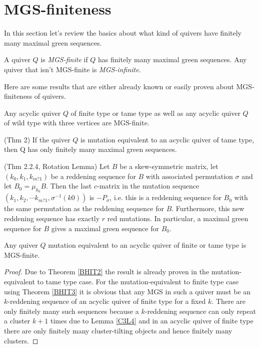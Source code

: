 \section{MGS-finiteness}
\indent In this section let's review the basics about what kind of quivers have finitely many maximal green sequences.
\begin{definition}
A quiver $Q$ is \textit{MGS-finite} if $Q$ has finitely many maximal green sequences. Any quiver that isn't MGS-finite is \textit{MGS-infinite}.
\end{definition}
\indent Here are some results that are either already known or easily proven about MGS-finiteness of quivers.
\begin{theorem}
\cite{BDP13}Any acyclic quiver $Q$ of finite type or tame type as well as any acyclic quiver $Q$ of wild type with three vertices are MGS-finite.
\end{theorem}
\begin{theorem}
\cite{BHIT15} (Thm 2)\label{BHIT2} If the quiver $Q$ is mutation equivalent to an acyclic quiver of tame type, then Q has only finitely many maximal green sequences.
\end{theorem}
\begin{theorem}
\cite{BHIT15} (Thm 2.2.4, Rotation Lemma) \label{BHIT3} Let $B$ be a skew-symmetric matrix, let $(k_0, k_1, k_{m?1})$ be a reddening sequence for $B$ with associated permutation $\sigma$ and let $B_0 = \mu_{k_0}B$. Then the last $c$-matrix in the mutation sequence $(k_1, k_2, \cdots k_{m?1}, \sigma^{-1}(k0))$ is $-P_{\sigma}$, i.e. this is a reddening sequence for $B_0$ with the same permutation as the reddening sequence for $B$. Furthermore, this new reddening sequence has exactly $r$ red mutations. In particular, a maximal green sequence for $B$ gives a maximal green sequence for $B_0$.
\end{theorem}
\begin{theorem}
Any quiver $Q$ mutation equivalent to an acyclic quiver of finite or tame type is MGS-finite.
\end{theorem}
\begin{proof}
Due to Theorem \ref{BHIT2} the result is already proven in the mutation-equivalent to tame type case. For the mutation-equivalent to finite type case using Theorem \ref{BHIT3} it is obvious that any MGS in such a quiver must be an $k$-reddening sequence of an acyclic quiver of finite type for a fixed $k$. There are only finitely many such sequences because a $k$-reddening sequence can only repeat a cluster $k+1$ times due to Lemma \ref{C3L4} and in an acyclic quiver of finite type there are only finitely many cluster-tilting objects and hence finitely many clusters.
\end{proof}
